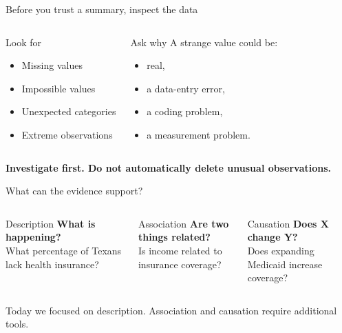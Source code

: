 \documentclass[11pt,aspectratio=169]{beamer}
\newcommand{\bigquestion}[1]{%
\begin{center}
\begin{minipage}{0.88\textwidth}
\centering
\Large\color{LBJnavy}\textbf{#1}
\end{minipage}
\end{center}}
\begin{document}
\begin{frame}{Before you trust a summary, inspect the data}
\begin{columns}[T,onlytextwidth]
\begin{block}{Look for}
\begin{itemize}
  \item Missing values
  \item Impossible values
  \item Unexpected categories
  \item Extreme observations
\end{itemize}
\end{block}
\begin{block}{Ask why}
A strange value could be:
\begin{itemize}
  \item real,
  \item a data-entry error,
  \item a coding problem,
  \item a measurement problem.
\end{itemize}
\end{block}
\end{columns}
\vfill
\bigquestion{Investigate first. Do not automatically delete unusual observations.}
\end{frame}

\begin{frame}{What can the evidence support?}
\begin{columns}[T,onlytextwidth]
\begin{block}{Description}
\textbf{What is happening?}\\[0.5em]
What percentage of Texans lack health insurance?
\end{block}
\begin{block}{Association}
\textbf{Are two things related?}\\[0.5em]
Is income related to insurance coverage?
\end{block}
\begin{block}{Causation}
\textbf{Does X change Y?}\\[0.5em]
Does expanding Medicaid increase coverage?
\end{block}
\end{columns}
\vfill
\alert{Today we focused on description. Association and causation require additional tools.}
\end{frame}
\end{document}
